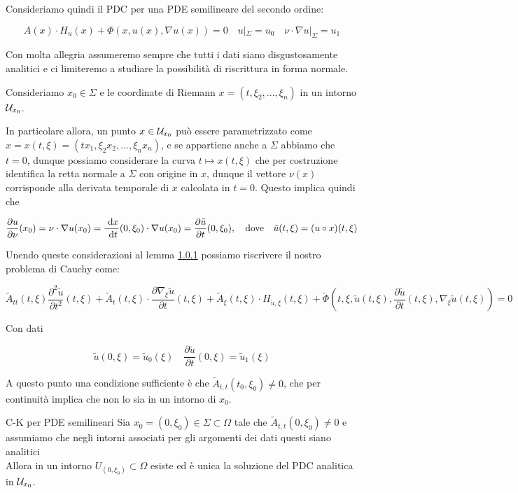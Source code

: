 \documentclass{article}
\begin{document}
Consideriamo quindi il PDC per una PDE semilineare del secondo ordine:

\[A(x)\cdot H_u(x) + \Phi(x,u(x),\nabla u(x)) = 0 \quad u|_\Sigma = u_0 \quad \nu \cdot \nabla u|_\Sigma = u_1\]

Con molta allegria assumeremo sempre che tutti i dati siano disgustosamente analitici e ci limiteremo a studiare la possibilità di riscrittura in forma normale.

Consideriamo $x_0 \in \Sigma$ e le coordinate di Riemann $x = (t,\xi_2,...,\xi_n)$ in un intorno $\mathcal{U}_{x_0}$.

In particolare allora, un punto $x \in \mathcal{U}_{x_0}$ può essere parametrizzato come $x = x(t,\xi) = (t x_1 , \xi_2 x_2,...,\xi_n x_n )$, e se appartiene anche a $\Sigma$ abbiamo che $t=0$, dunque possiamo considerare la curva $t\mapsto x(t,\xi)$ che per costruzione identifica la retta normale a $\Sigma$ con origine in $x$, dunque il vettore $\nu(x)$ corrisponde alla derivata temporale di $x$ calcolata in $t=0$. Questo implica quindi che

\[\frac{\partial u}{\partial \nu} (x_0) = \nu \cdot \nabla u(x_0) = \frac{\text{ d} x}{\text{ d} t}(0,\xi_0) \cdot \nabla u(x_0) = \frac{\partial \tilde{u}}{\partial t}(0,\xi_0), \quad \text{dove} \quad \tilde{u}(t,\xi) = (u\circ x)(t,\xi)\]

Unendo queste considerazioni al lemma \href{lem:1.0.1}{1.0.1} possiamo riscrivere il nostro problema di Cauchy come:

\[\tilde{A}_{tt}(t,\xi) \frac{\partial^2 \tilde{u}}{\partial t^2}(t,\xi) + \tilde{A}_t(t,\xi)\cdot \frac{\partial \nabla_\xi \tilde{u}}{\partial t}(t,\xi) + \tilde{A}_\xi(t,\xi) \cdot H_{\tilde{u},\xi}(t,\xi) +  \tilde{\Phi}\left(t,\xi,\tilde{u}(t,\xi), \frac{\partial \tilde{u}}{\partial t}(t,\xi), \nabla_\xi \tilde{u}(t,\xi)\right) = 0\]

Con dati 

\[\tilde{u}(0,\xi) = \tilde{u}_0(\xi) \quad \frac{\partial \tilde{u}}{\partial t}(0,\xi) = \tilde{u}_1(\xi)\]

A questo punto una condizione sufficiente è che $\tilde{A}_{t,t}(t_0,\xi_0)\neq 0$, che per continuità implica che non lo sia in un intorno di $x_0$.

\begin{corollary}{C-K per PDE semilineari}{}
    Sia $x_0 = (0,\xi_0)\in\Sigma\subset \Omega$ tale che $\tilde{A}_{t,t}(0,\xi_0)\neq 0$ e assumiamo che negli intorni associati per gli argomenti dei dati questi siano analitici\\
    Allora in un intorno $U_{(0,\xi_0)}\subset\Omega$ esiste ed è unica la soluzione del PDC analitica in $\mathcal{U}_{x_0}$.
\end{corollary}
\end{document}
